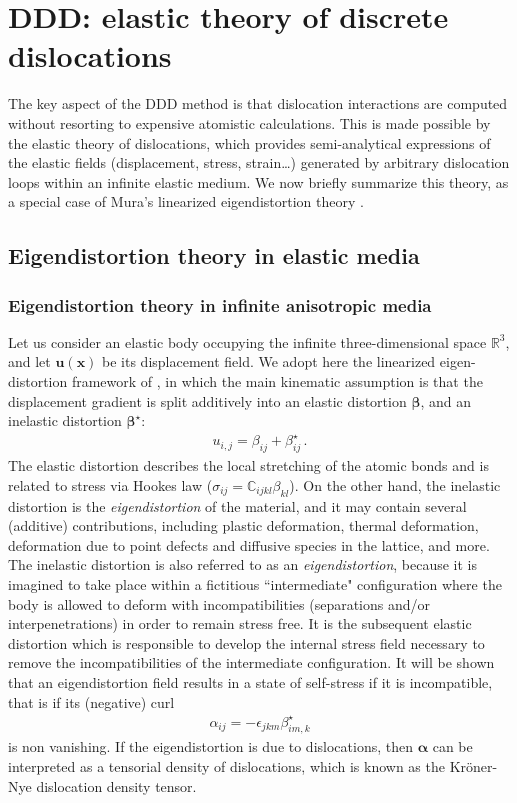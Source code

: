 \newpage
\chapter{DDD: elastic theory of discrete dislocations\label{elasticTheoryDislocations}}


The key aspect of the DDD method is that dislocation interactions are computed without resorting to expensive atomistic calculations. This is made possible by the 
elastic theory of dislocations, which provides semi-analytical expressions of the elastic fields (displacement, stress, strain\ldots) generated by  arbitrary dislocation loops within an infinite elastic medium. We now briefly summarize this theory,  as a special case of Mura's linearized eigendistortion theory \citep{Mura:1987wt}. 

\section{Eigendistortion theory in elastic media}
\subsection{Eigendistortion theory in infinite anisotropic media\label{eigendist_classical}}
Let us consider an elastic body occupying the infinite three-dimensional space $\mathbb{R}^3$, and let $\bm u(\bm x)$ be its displacement field. We adopt here the linearized eigen-distortion framework of \cite{Mura:1987wt}, in which the main kinematic assumption  is that the displacement gradient is split additively into an elastic distortion $\bm \beta$, and an inelastic distortion $\bm \beta^\star$:
\begin{align}
u_{i,j}=\beta_{ij}+\beta^\star_{ij}\, .
\label{linear_decomposition}
\end{align}
The elastic distortion describes the local stretching of the atomic bonds and is related to stress via Hookes law ($\sigma_{ij}=\mathbb{C}_{ijkl}\beta_{kl}$). On the other hand, the inelastic distortion is the \textit{eigendistortion} of  the material, and it may contain several (additive) contributions, including plastic deformation, thermal deformation, deformation due to point defects and diffusive species in the lattice, and more. The inelastic distortion is also referred to as an \textit{eigendistortion}, because it is imagined to take place within a fictitious ``intermediate" configuration where the body is allowed to deform with incompatibilities (separations and/or interpenetrations) in order  to remain stress free. It is the subsequent elastic distortion which is responsible to develop the internal stress field necessary to remove the incompatibilities of the intermediate configuration. It will be shown that an eigendistortion field results in a state of self-stress if it is incompatible, that is if its (negative) curl 
\begin{align}
\alpha_{ij}=-\epsilon_{jkm}\beta^\star_{im,k}
\label{alpha}
\end{align}
is non vanishing. If the eigendistortion is due to dislocations, then $\bm \alpha$ can be interpreted as a tensorial density of dislocations, which  is  known as the Kr\"oner-Nye dislocation density tensor.


